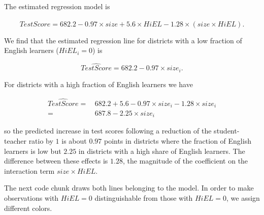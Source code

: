 \documentclass[]{book}
\theoremstyle{definition}
\theoremstyle{definition}
\theoremstyle{definition}
\theoremstyle{remark}
\begin{document}
The estimated regression model is

\[ \widehat{TestScore} = 682.2 - 0.97 \times size + 5.6 \times HiEL - 1.28 \times (size \times HiEL). \]

We find that the estimated regression line for districts with a low
fraction of English learners (\(HiEL_i=0\)) is

\[ \widehat{TestScore} = 682.2 - 0.97\times size_i. \]

For districts with a high fraction of English learners we have

\begin{align} 
  \widehat{TestScore} =& \, 682.2 + 5.6 - 0.97\times size_i - 1.28 \times size_i \\
   =& \, 687.8 - 2.25 \times size_i
\end{align}

so the predicted increase in test scores following a reduction of the
student-teacher ratio by \(1\) is about \(0.97\) points in districts
where the fraction of English learners is low but \(2.25\) in districts
with a high share of English learners. The difference between these
effects is \(1.28\), the magnitude of the coefficient on the interaction
term \(size \times HiEL\).

The next code chunk draws both lines belonging to the model. In order to
make observations with \(HiEL = 0\) distinguishable from those with
\(HiEL = 0\), we assign different colors.
\end{document}
